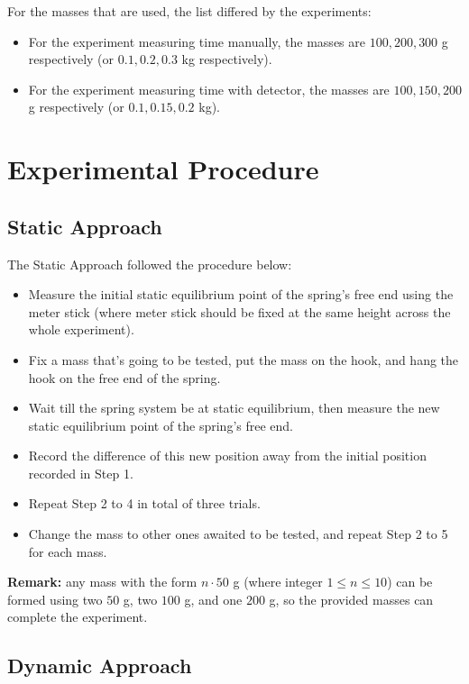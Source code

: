 \documentclass{article}
\begin{document}
For the masses that are used, the list differed by the experiments:
\begin{itemize}
    \item For the experiment measuring time manually, the masses are $100,200,300$ g respectively (or $0.1,0.2,0.3$ kg respectively).
    \item For the experiment measuring time with detector, the masses are $100,150,200$ g respectively (or $0.1,0.15,0.2$ kg).
\end{itemize}

\newpage

\section{Experimental Procedure}
\subsection{Static Approach}
The Static Approach followed the procedure below:
\begin{itemize}
    \item[1.] Measure the initial static equilibrium point of the spring's free end using the meter stick (where meter stick should be fixed at the same height across the whole experiment).
    \item[2.] Fix a mass that's going to be tested, put the mass on the hook, and hang the hook on the free end of the spring.
    \item[3.] Wait till the spring system be at static equilibrium, then measure the new static equilibrium point of the spring's free end.
    \item[4.] Record the difference of this new position away from the initial position recorded in Step 1. 
    \item[5.] Repeat Step 2 to 4 in total of three trials.
    \item[6.] Change the mass to other ones awaited to be tested, and repeat Step 2 to 5 for each mass.  
\end{itemize}
\textbf{Remark:} any mass with the form $n\cdot 50$ g (where integer $1\leq n\leq 10$) can be formed using two $50$ g, two $100$ g, and one $200$ g, so the provided masses can complete the experiment.

\subsection{Dynamic Approach}
\end{document}
